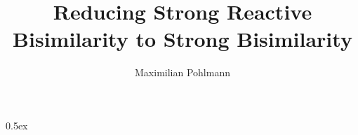\documentclass[11pt,a4paper,openany]{book}
\begin{document}
\title{Reducing Strong Reactive Bisimilarity to Strong Bisimilarity}
\author{Maximilian Pohlmann}



\newpage\null\thispagestyle{empty}\newpage

\tableofcontents
\newpage\null\thispagestyle{empty}\newpage


\parindent 0pt\parskip 0.5ex
















{


}

\appendix




\newpage\null\thispagestyle{empty}

\newpage


\newpage
{}
%
%

\end{document}
